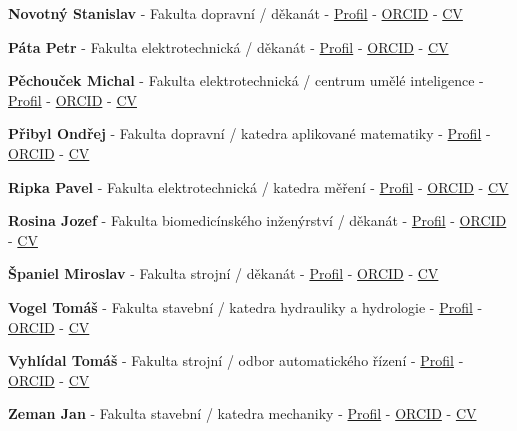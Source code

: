 \documentclass[11pt,a4paper]{article}
\newcommand{\memberComplete}[5]{%
  \item \textbf{#1} - #2 - \href{#3}{Profil} - \href{#4}{ORCID} - \href{#5}{CV}
}
\begin{document}
\begin{memberlist}
\memberComplete{Novotný Stanislav}
{Fakulta dopravní / děkanát}
{https://scholar.google.com/citations?user=hV5qZbMAAAAJ}
{https://orcid.org/0000-0001-8712-3721}
{https://drive.google.com/open?id=1297sGqs6i-c2QHSXLOpsPNB87S6iX492}

\memberComplete{Páta Petr}
{Fakulta elektrotechnická / děkanát}
{https://scholar.google.com/citations?user=cOhEJCsAAAAJ}
{https://orcid.org/0000-0002-6561-9088}
{https://drive.google.com/open?id=1txtNDWXRTMqCZdkGcxrPz9rsGHE0Zp7C}
\memberComplete{Pěchouček Michal}
{Fakulta elektrotechnická / centrum umělé inteligence}
{https://scholar.google.com/citations?user=SdQcGHcAAAAJ}
{https://orcid.org/0000-0002-2582-6795}
{https://drive.google.com/open?id=1Dbs6f_8hVN--S1et72I03F5HrnJQHsCm}

\memberComplete{Přibyl Ondřej}
{Fakulta dopravní / katedra aplikované matematiky}
{https://scholar.google.com/citations?user=_8Z2358AAAAJ}
{https://orcid.org/0000-0002-6251-5881}
{https://drive.google.com/open?id=1c7yMxFhY3c3HKXdK8GNogjB8n0qKk14R}

\memberComplete{Ripka Pavel}
{Fakulta elektrotechnická / katedra měření}
{https://scholar.google.com/citations?user=F5NmzowAAAAJ}
{https://orcid.org/0000-0003-1115-6265}
{https://drive.google.com/open?id=1OVSpRhQ_RxCO6refBg0gNMHOPVIOX9MM}

\memberComplete{Rosina Jozef}
{Fakulta biomedicínského inženýrství / děkanát}
{https://www.researchgate.net/profile/Jozef-Rosina-2}
{https://orcid.org/0000-0002-5519-3028}
{https://drive.google.com/open?id=1QGtsY656hVuC93aqRUSjNmFpkXvKNzge}

\memberComplete{Španiel Miroslav}
{Fakulta strojní / děkanát}
{https://usermap.cvut.cz/profile/bfadcd5a-821f-4359-9eb5-af2d4c355d5b?lang=en}
{https://orcid.org/0000-0003-3600-863X}
{https://drive.google.com/open?id=1WTpMZzI6zbtkBMC0yGCO8jtEOAPuTKVQ}

\memberComplete{Vogel Tomáš}
{Fakulta stavební / katedra hydrauliky a hydrologie}
{https://scholar.google.com/citations?user=WWE4dEgAAAAJ}
{https://orcid.org/0000-0003-1700-6356}
{https://drive.google.com/open?id=1R_0CpZFViFzClrJjTzcJLze2ZDWHuQDW}

\memberComplete{Vyhlídal Tomáš}
{Fakulta strojní / odbor automatického řízení}
{https://scholar.google.com/citations?user=UE5FU9UAAAAJ}
{https://orcid.org/0000-0002-1544-8575}
{https://drive.google.com/open?id=1mE6acQlrG5Y03HeujI3WEBfQMkdTPMmD}

\memberComplete{Zeman Jan}
{Fakulta stavební / katedra mechaniky}
{https://scholar.google.com/citations?user=ncrDMjEAAAAJ}
{https://orcid.org/0000-0003-2503-8120}
{https://drive.google.com/open?id=1LbrtUL_9sHJFXn7wlDZM3Uo4f36kj5op}

\end{memberlist}
\end{document}
